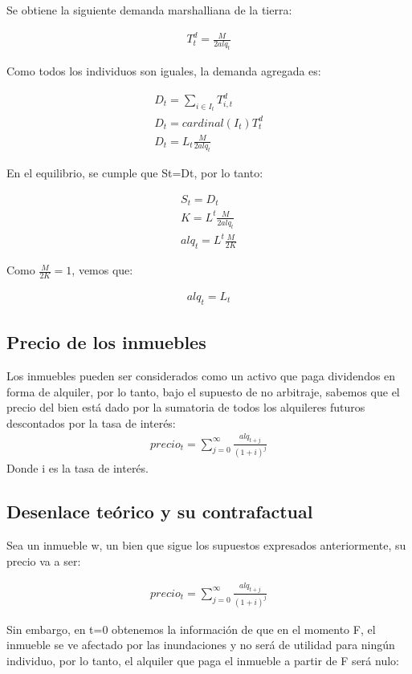 \documentclass[12pt]{article}
\begin{document}
Se obtiene la siguiente demanda marshalliana de la tierra:

\begin{align*}
T_{t}^{d} = \frac{M}{2alq_t}
\end{align*}

Como todos los individuos son iguales, la demanda agregada es:


\begin{align*}
D_{t} = \sum_{i \in I_t}{T^{d}_{i,t}}
\\
D_t = cardinal(I_t)T^{d}_t
\\
D_t = L_t \frac{M}{2alq_t}
\end{align*}


En el equilibrio, se cumple que St=Dt, por lo tanto:

\begin{align*}
S_t = D_t
\\
K = L^t\frac{M}{2alq_t}
\\
alq_t = L^t \frac{M}{2K}
\end{align*}

Como {$\frac{M}{2K} = 1 $}, vemos que:

\begin{align*}
alq_t=L_t
\end{align*}

\subsection{Precio de los inmuebles}
Los inmuebles pueden ser considerados como un activo que paga dividendos en forma de alquiler, por lo tanto, bajo el supuesto de no arbitraje, sabemos que el precio del bien está dado por la sumatoria de todos los alquileres futuros descontados por la tasa de interés:
\begin{align*}
precio_t = \sum_{j=0}^{\infty}{\frac{alq_{t+j}}{(1+i)^j}}
\end{align*}
Donde i es la tasa de interés.

\subsection{Desenlace teórico y su contrafactual}
Sea un inmueble w, un bien que sigue los supuestos expresados anteriormente, su precio va a ser:

\begin{align*}
precio_t = \sum_{j=0}^{\infty}{\frac{alq_{t+j}}{(1+i)^j}}
\end{align*}

Sin embargo, en  t=0 obtenemos la información de que en el momento F, el inmueble se ve afectado por las inundaciones y no será de utilidad para ningún individuo, por lo tanto, el alquiler que paga el inmueble a partir de F será nulo:
\end{document}
